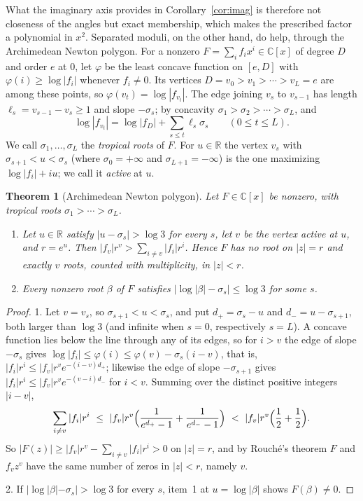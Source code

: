 \documentclass[11pt]{article}
\newtheorem{theorem}{Theorem}[section]
\newcommand{\R}{\mathbb R}
\begin{document}
What the imaginary axis provides in Corollary~\ref{cor:imag} is therefore
not closeness of the angles but exact membership, which makes the
prescribed factor a polynomial in $x^2$.  Separated moduli, on the other
hand, do help, through the Archimedean Newton polygon.  For a nonzero
$F=\sum_if_ix^i\in\mathbb C[x]$ of degree $D$ and order $e$ at $0$, let
$\varphi$ be the least concave function on $[e,D]$ with
$\varphi(i)\ge\log|f_i|$ whenever $f_i\ne0$.  Its vertices
$D=v_0>v_1>\cdots>v_L=e$ are among these points, so $\varphi(v_t)=\log|f_{v_t}|$.
The edge joining $v_s$ to $v_{s-1}$ has length $\ell_s=v_{s-1}-v_s\ge1$ and
slope $-\sigma_s$; by concavity $\sigma_1>\sigma_2>\cdots>\sigma_L$, and
\[
  \log|f_{v_t}|=\log|f_D|+\sum_{s\le t}\ell_s\sigma_s\qquad(0\le t\le L).
\]
We call $\sigma_1,\ldots,\sigma_L$ the \emph{tropical roots} of $F$.  For
$u\in\R$ the vertex $v_s$ with $\sigma_{s+1}<u<\sigma_s$ (where
$\sigma_0=+\infty$ and $\sigma_{L+1}=-\infty$) is the one maximizing
$\log|f_i|+iu$; we call it \emph{active} at $u$.

\begin{theorem}[Archimedean Newton polygon]\label{thm:archnewton}
Let $F\in\mathbb C[x]$ be nonzero, with tropical roots $\sigma_1>\cdots>\sigma_L$.
\begin{enumerate}
\item Let $u\in\R$ satisfy $|u-\sigma_s|>\log3$ for every $s$, let $v$ be the
vertex active at $u$, and $r=e^u$.  Then
$|f_v|r^v>\sum_{i\ne v}|f_i|r^i$.  Hence $F$ has no root on $|z|=r$ and
exactly $v$ roots, counted with multiplicity, in $|z|<r$.
\item Every nonzero root $\beta$ of $F$ satisfies
$\bigl|\log|\beta|-\sigma_s\bigr|\le\log3$ for some $s$.
\end{enumerate}
\end{theorem}

\begin{proof}
1.  Let $v=v_s$, so $\sigma_{s+1}<u<\sigma_s$, and put $d_+=\sigma_s-u$ and
$d_-=u-\sigma_{s+1}$, both larger than $\log3$ (and infinite when $s=0$,
respectively $s=L$).  A concave function lies below the line through any of
its edges, so for $i>v$ the edge of slope $-\sigma_s$ gives
$\log|f_i|\le\varphi(i)\le\varphi(v)-\sigma_s(i-v)$, that is,
$|f_i|r^i\le|f_v|r^ve^{-(i-v)d_+}$; likewise the edge of slope $-\sigma_{s+1}$
gives $|f_i|r^i\le|f_v|r^ve^{-(v-i)d_-}$ for $i<v$.  Summing over the
distinct positive integers $|i-v|$,
\[
  \sum_{i\ne v}|f_i|r^i\ \le\ |f_v|r^v\Bigl(\frac1{e^{d_+}-1}+\frac1{e^{d_-}-1}\Bigr)
  \ <\ |f_v|r^v\Bigl(\frac12+\frac12\Bigr).
\]
So $|F(z)|\ge|f_v|r^v-\sum_{i\ne v}|f_i|r^i>0$ on $|z|=r$, and by Rouch\'e's
theorem $F$ and $f_vz^v$ have the same number of zeros in $|z|<r$, namely $v$.

2.  If $|\log|\beta|-\sigma_s|>\log3$ for every $s$, item~1 at
$u=\log|\beta|$ shows $F(\beta)\ne0$.
\end{proof}
\end{document}
